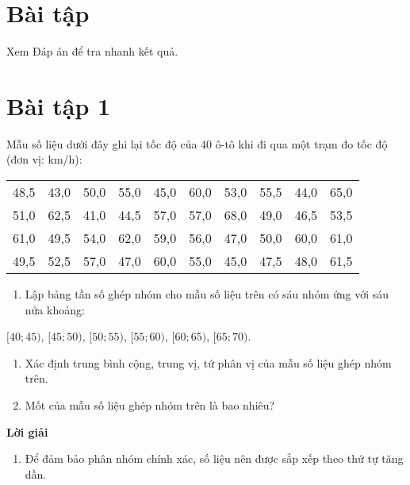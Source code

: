 \documentclass[
  letterpaper,
  DIV=11,
  numbers=noendperiod]{scrartcl}
\providecommand{\tightlist}{%
  \setlength{\itemsep}{0pt}\setlength{\parskip}{0pt}}\usepackage{longtable,booktabs,array}
\begin{document}
\section{Bài tập}\label{buxe0i-tux1eadp}

Xem Đáp án để tra nhanh kết quả.

\section*{Bài tập 1}

Mẫu số liệu dưới đây ghi lại tốc độ của 40 ô-tô khi đi qua một trạm đo
tốc độ (đơn vị: km/h):

\begin{table}[!h]
\centering
\begin{tabular}{cccccccccc}
\toprule
48,5 & 43,0 & 50,0 & 55,0 & 45,0 & 60,0 & 53,0 & 55,5 & 44,0 & 65,0\\
51,0 & 62,5 & 41,0 & 44,5 & 57,0 & 57,0 & 68,0 & 49,0 & 46,5 & 53,5\\
61,0 & 49,5 & 54,0 & 62,0 & 59,0 & 56,0 & 47,0 & 50,0 & 60,0 & 61,0\\
49,5 & 52,5 & 57,0 & 47,0 & 60,0 & 55,0 & 45,0 & 47,5 & 48,0 & 61,5\\
\bottomrule
\end{tabular}
\end{table}

\begin{enumerate}
\def\labelenumi{\alph{enumi}.}
\tightlist
\item
  Lập bảng tần số ghép nhóm cho mẫu số liệu trên có sáu nhóm ứng với sáu
  nửa khoảng:
\end{enumerate}

\begin{center}
$[40; 45)$, $[45 ; 50)$, $[50; 55)$, $[55 ; 60)$, $[60; 65)$, $[65; 70)$.
\end{center}

\begin{enumerate}
\def\labelenumi{\alph{enumi}.}
\setcounter{enumi}{1}
\item
  Xác định trung bình cộng, trung vị, tứ phân vị của mẫu số liệu ghép
  nhóm trên.
\item
  Mốt của mẫu số liệu ghép nhóm trên là bao nhiêu?
\end{enumerate}

\begin{center}
\textbf{Lời giải}
\end{center}

\begin{enumerate}
\def\labelenumi{\alph{enumi}.}
\tightlist
\item
  Để đảm bảo phân nhóm chính xác, số liệu nên được sắp xếp theo thứ tự
  tăng dần.
\end{enumerate}
\end{document}
